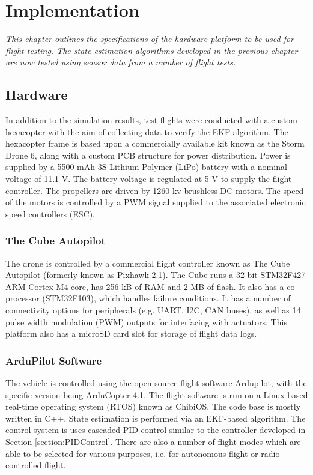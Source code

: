 
\chapter{Implementation}\label{chapter:Implementation}
\textit{This chapter outlines the specifications of the hardware platform to be used for flight testing. The state estimation algorithms developed in the previous chapter are now tested using sensor data from a number of flight tests. }


\section{Hardware}\label{section:Hardware}

In addition to the simulation results, test flights were conducted with a custom hexacopter with the aim of collecting data to verify the EKF algorithm. The hexacopter frame is based upon a commercially available kit known as the Storm Drone 6, along with a custom PCB structure for power distribution. Power is supplied by a 5500 mAh 3S Lithium Polymer (LiPo) battery with a nominal voltage of 11.1 V. The battery voltage is regulated at 5 V to supply the flight controller. The propellers are driven by 1260 kv brushless DC motors. The speed of the motors is controlled by a PWM signal supplied to the associated electronic speed controllers (ESC).

\subsection{The Cube Autopilot}
The drone is controlled by a commercial flight controller known as The Cube Autopilot (formerly known as Pixhawk 2.1). The Cube runs a 32-bit STM32F427 ARM Cortex M4 core, has 256 kB of RAM and 2 MB of flash. It also has a co-processor (STM32F103), which handles failure conditions. It has a number of connectivity options for peripherals (e.g. UART, I2C, CAN buses), as well as 14 pulse width modulation (PWM) outputs for interfacing with actuators. This platform also has a microSD card slot for storage of flight data logs.
\subsection{ArduPilot Software}
The vehicle is controlled using the open source flight software Ardupilot, with the specific version being ArduCopter 4.1. The flight software is run on a Linux-based real-time operating system (RTOS) known as ChibiOS. The code base is mostly written in C++. State estimation is performed via an EKF-based algorithm. The control system is uses cascaded PID control similar to the controller developed in Section \ref{section:PIDControl}. There are also a number of flight modes which are able to be selected for various purposes, i.e. for autonomous flight or radio-controlled flight.


